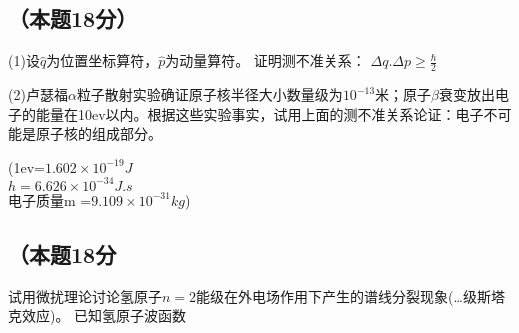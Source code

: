 \subsection{（本题18分）}
(1)设$\hat q$为位置坐标算符，$\hat p$为动量算符。
证明测不准关系：
$\Delta q.\Delta p\ge \frac{\hbar}{2}$

(2)卢瑟福$\alpha$粒子散射实验确证原子核半径大小数量级为$10^{-13}$米；原子$\beta$衰变放出电子的能量在10ev以内。根据这些实验事实，试用上面的测不准关系论证：电子不可能是原子核的组成部分。

(1ev=$1.602\times10^{-19}J$\\
$h=6.626\times10^{-34}J.s$\\
电子质量m =$9.109\times {10^{-31}kg}$)

\subsection{（本题18分}
试用微扰理论讨论氢原子$n=2$能级在外电场作用下产生的谱线分裂现象(…级斯塔克效应)。
已知氢原子波函数